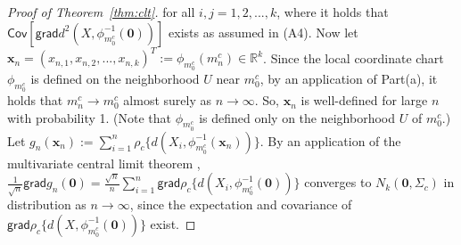 \documentclass[preprint]{imsart}
\newcommand{\bbR}{\mathbb{R}}
\theoremstyle{plain}
\theoremstyle{remark}
\begin{document}
\begin{appendix}
\begin{proof}[Proof of Theorem~\ref{thm:clt}]
for all $i, j = 1, 2, ..., k$, where it holds that $\textsf{Cov}[\textsf{grad}d^2(X, \phi_{m_{0}^{c}}^{-1}(\mathbf{0}))]$ exists as assumed in (A4). Now let $\mathbf{x}_{n}=(x_{n,1}, x_{n,2}, ..., x_{n,k})^{T}:=\phi_{m^{c}_0}(m^{c}_{n}) \in \bbR^{k}$. Since the local coordinate chart $\phi_{m^{c}_{0}}$ is defined on the neighborhood $U$ near $m^{c}_{0}$, by an application of Part(a), it holds that $m_{n}^{c} \rightarrow m^{c}_{0}$ almost surely as $n\rightarrow \infty$. So, $\mathbf{x}_{n}$ is well-defined for large $n$ with probability 1. (Note that $\phi_{m^{c}_{0}}$ is defined only on the neighborhood $U$ of $m^{c}_{0}$.) Let $g_{n}(\mathbf{x}_{n}):= \sum_{i=1}^{n} \rho_{c}\{d(X_{i}, \phi^{-1}_{m^{c}_{0}}(\mathbf{x}_{n}))\}$. By an application of the multivariate central limit theorem  \citep[cf.][]{anderson1958introduction}, $\frac{1}{\sqrt{n}} \textsf{grad}g_{n}(\mathbf{0}) = \frac{\sqrt{n}}{n}\sum_{i=1}^{n}\textsf{grad}\rho_{c}\{d(X_i, \phi_{m^{c}_{0}}^{-1}(\mathbf{0}))\}$ converges to $N_{k}(\mathbf{0}, \Sigma_{c})$ in distribution as $n \rightarrow \infty$, since the expectation and covariance of $\textsf{grad}\rho_{c}\{d(X, \phi^{-1}_{m^{c}_{0}}(\mathbf{0}))\}$ exist.



\end{proof}
\end{appendix}
\end{document}
